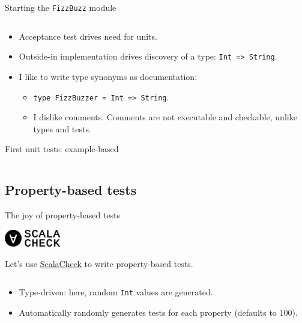 \begin{frame}[fragile]{Starting the \texttt{FizzBuzz} module}
  \inputminted{scala}{FizzBuzz1.scala}

  \begin{itemize}
  \item Acceptance test drives need for units.
  \item Outside-in implementation drives discovery of a type:      
    \texttt{Int => String}.
  \item I like to write \alert{type synonyms} as \alert{documentation}:
    \begin{itemize}
    \item \texttt{type FizzBuzzer = Int => String}.
    \item I dislike \alert{comments}. Comments are not executable and checkable, unlike types and tests.
    \end{itemize}
  \end{itemize}
\end{frame}

\begin{frame}[fragile]{First unit tests: example-based}
  \inputminted{scala}{FizzBuzzSpec1.scala}
\end{frame}

\subsection{Property-based tests}

\begin{frame}[fragile]{The joy of property-based tests}
  \begin{center}
    \includegraphics[height=0.75cm]{logo_forall_h61.png}
    \includegraphics[height=0.75cm]{logo_scalacheck_h61.png}
  \end{center}

  Let's use \href{http://scalacheck.org/}{ScalaCheck} to write \alert{property-based} tests.

  \inputminted{scala}{FizzBuzzSpec2.scala}

  \begin{itemize}
  \item \alert{Type-driven}: here, random \texttt{Int} values are generated.
  \item Automatically randomly generates tests for each property (defaults to 100).
  \end{itemize}
\end{frame}

